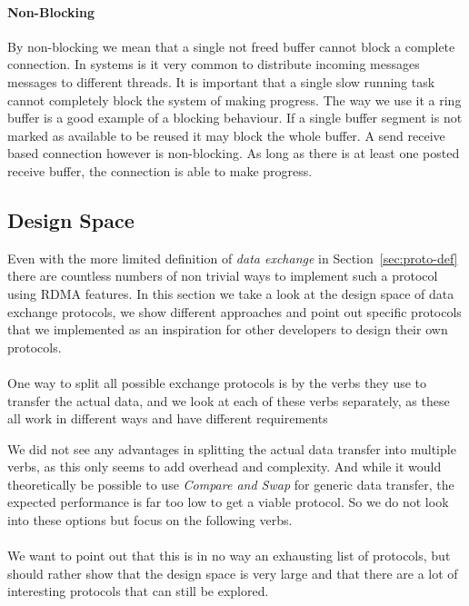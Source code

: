 \paragraph{Non-Blocking} By non-blocking we mean that a single not freed buffer cannot block a complete connection. In systems
is it very common to distribute incoming messages messages to different threads. It is important that a single slow running 
task cannot completely block the system of making progress. The way we use it a ring buffer is a good example of a blocking
behaviour. If a single buffer segment is not marked as available to be reused it may block the whole buffer. A send receive 
based connection however is non-blocking. As long as there is at least one posted receive buffer, the connection is able to
make progress.




\subsection{Design Space} \label{sec:proto-ds}


Even with the more limited definition of \emph{data exchange} in Section~\ref{sec:proto-def} there are countless numbers
of non trivial ways to implement such a protocol using RDMA features. In this section we take a look at the design 
space of data exchange protocols, we show different approaches and point out specific protocols that we implemented
as an inspiration for other developers to design their own protocols.


\paragraph{} One way to split all possible exchange protocols is by the verbs they use to transfer the actual 
data, and we look at each of these verbs separately, as these all work in different ways and have different requirements

We did not see any advantages in splitting the actual data transfer into multiple verbs, as this only seems to add overhead 
and complexity. And while it would theoretically be possible to use \emph{Compare and Swap} for generic data transfer,
the expected performance is far too low to get a viable protocol. So we do not look into these options but focus on the 
following verbs.

\paragraph{} We want to point out that this is in no way an exhausting list of protocols, but should rather show that the 
design space is very large and that there are a lot of interesting protocols that can still be explored.


